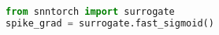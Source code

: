 \begin{lstlisting}[language=Python, caption={Surrogate in snnTorch}]
from snntorch import surrogate
spike_grad = surrogate.fast_sigmoid() 
\end{lstlisting}